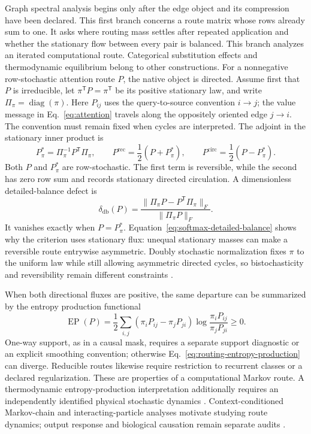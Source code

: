 \documentclass[10pt]{article}
\newcommand{\diag}{\operatorname{diag}}
\theoremstyle{definition}
\theoremstyle{remark}
\begin{document}
Graph spectral analysis begins only after the edge object and its compression have been declared.
This first branch concerns a route matrix whose rows already sum to one.  It asks where routing mass
settles after repeated application and whether the stationary flow between every pair is balanced.
This branch analyzes an iterated computational route.  Categorical substitution effects and
thermodynamic equilibrium belong to other constructions.
For a nonnegative row-stochastic attention route $P$, the native object is directed.  Assume first
that $P$ is irreducible, let $\pi^{\mathsf T}P=\pi^{\mathsf T}$ be its positive stationary law,
and write $\Pi_\pi=\diag(\pi)$.  Here $P_{ij}$ uses the query-to-source convention $i\to j$;
the value message in Eq.~\ref{eq:attention} travels along the oppositely oriented edge $j\to i$.
The convention must remain fixed when cycles are interpreted.  The adjoint in the stationary inner
product is
\begin{equation}
P^*_{\pi}=\Pi_\pi^{-1}P^{\mathsf T}\Pi_\pi,
\qquad
P^{\mathrm{rec}}=\frac12(P+P^*_{\pi}),
\qquad
P^{\mathrm{circ}}=\frac12(P-P^*_{\pi}).
\label{eq:routing-reciprocal-circulation}
\end{equation}
Both $P$ and $P^*_{\pi}$ are row-stochastic.  The first term is reversible, while the second has
zero row sum and records stationary directed circulation.  A dimensionless detailed-balance defect
is
\begin{equation}
\delta_{\mathrm{db}}(P)
=\frac{\|\Pi_\pi P-P^{\mathsf T}\Pi_\pi\|_F}
{\|\Pi_\pi P\|_F}.
\label{eq:detailed-balance-defect}
\end{equation}
It vanishes exactly when $P=P^*_{\pi}$.  Equation~\ref{eq:softmax-detailed-balance} shows why the
criterion uses stationary flux: unequal stationary masses can make a reversible route entrywise
asymmetric.  Doubly stochastic normalization fixes $\pi$ to the uniform law while still allowing
asymmetric directed cycles, so bistochasticity and reversibility remain different constraints
\cite{sander2022,shahbazi2025}.

When both directional fluxes are positive, the same departure can be summarized by the entropy
production functional
\begin{equation}
\operatorname{EP}(P)
=\frac12\sum_{i,j}
(\pi_iP_{ij}-\pi_jP_{ji})
\log\frac{\pi_iP_{ij}}{\pi_jP_{ji}}\geq0.
\label{eq:routing-entropy-production}
\end{equation}
One-way support, as in a causal mask, requires a separate support diagnostic or an explicit
smoothing convention; otherwise Eq.~\ref{eq:routing-entropy-production} can diverge.  Reducible
routes likewise require restriction to recurrent classes or a declared regularization.  These are
properties of a computational Markov route.  A thermodynamic entropy-production interpretation
additionally requires an independently identified physical stochastic dynamics
\cite{schnakenberg1976}.  Context-conditioned Markov-chain and interacting-particle analyses
motivate studying route dynamics; output response and biological causation remain separate audits
\cite{ildiz2024,geshkovski2023}.
\end{document}

